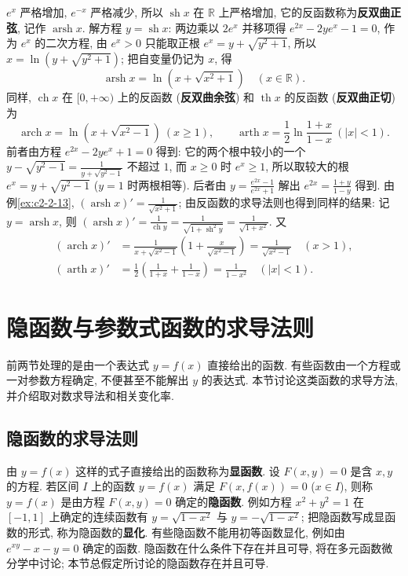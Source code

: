 \documentclass[UTF8,openany]{ctexbook}
\theoremstyle{chinesetextbook}
\begin{document}
$e^x$ 严格增加, $e^{-x}$ 严格减少, 所以 $\operatorname{sh}x$ 在 $\mathbb R$ 上严格增加, 它的反函数称为\textbf{反双曲正弦}, 记作 $\operatorname{arsh}x$. 解方程 $y=\operatorname{sh}x$: 两边乘以 $2e^x$ 并移项得 $e^{2x}-2ye^x-1=0$, 作为 $e^x$ 的二次方程, 由 $e^x>0$ 只能取正根 $e^x=y+\sqrt{y^2+1}$, 所以 $x=\ln\left(y+\sqrt{y^2+1}\right)$; 把自变量仍记为 $x$, 得
\[
\operatorname{arsh}x=\ln\left(x+\sqrt{x^2+1}\right)\quad(x\in\mathbb R).
\]
同样, $\operatorname{ch}x$ 在 $[0,+\infty)$ 上的反函数 (\textbf{反双曲余弦}) 和 $\operatorname{th}x$ 的反函数 (\textbf{反双曲正切}) 为
\[
\operatorname{arch}x=\ln\left(x+\sqrt{x^2-1}\right)\ (x\ge1),\qquad\operatorname{arth}x=\frac12\ln\frac{1+x}{1-x}\ (|x|<1).
\]
前者由方程 $e^{2x}-2ye^x+1=0$ 得到: 它的两个根中较小的一个 $\displaystyle y-\sqrt{y^2-1}=\frac1{y+\sqrt{y^2-1}}$ 不超过 $1$, 而 $x\ge0$ 时 $e^x\ge1$, 所以取较大的根 $e^x=y+\sqrt{y^2-1}$ ($y=1$ 时两根相等). 后者由 $\displaystyle y=\frac{e^{2x}-1}{e^{2x}+1}$ 解出 $\displaystyle e^{2x}=\frac{1+y}{1-y}$ 得到. 由例\ref{ex:c2-2-13}, $\displaystyle(\operatorname{arsh}x)'=\frac1{\sqrt{x^2+1}}$; 由反函数的求导法则也得到同样的结果: 记 $y=\operatorname{arsh}x$, 则 $\displaystyle(\operatorname{arsh}x)'=\frac1{\operatorname{ch}y}=\frac1{\sqrt{1+\operatorname{sh}^2y}}=\frac1{\sqrt{1+x^2}}$. 又
\[
\begin{aligned}
(\operatorname{arch}x)'&=\frac1{x+\sqrt{x^2-1}}\left(1+\frac x{\sqrt{x^2-1}}\right)=\frac1{\sqrt{x^2-1}}\quad(x>1),\\
(\operatorname{arth}x)'&=\frac12\left(\frac1{1+x}+\frac1{1-x}\right)=\frac1{1-x^2}\quad(|x|<1).
\end{aligned}
\]
\section{隐函数与参数式函数的求导法则}
前两节处理的是由一个表达式 $y=f(x)$ 直接给出的函数. 有些函数由一个方程或一对参数方程确定, 不便甚至不能解出 $y$ 的表达式. 本节讨论这类函数的求导方法, 并介绍取对数求导法和相关变化率.
\subsection{隐函数的求导法则}
由 $y=f(x)$ 这样的式子直接给出的函数称为\textbf{显函数}. 设 $F(x,y)=0$ 是含 $x,y$ 的方程. 若区间 $I$ 上的函数 $y=f(x)$ 满足 $F(x,f(x))=0$ ($x\in I$), 则称 $y=f(x)$ 是由方程 $F(x,y)=0$ 确定的\textbf{隐函数}. 例如方程 $x^2+y^2=1$ 在 $[-1,1]$ 上确定的连续函数有 $y=\sqrt{1-x^2}$ 与 $y=-\sqrt{1-x^2}$; 把隐函数写成显函数的形式, 称为隐函数的\textbf{显化}. 有些隐函数不能用初等函数显化, 例如由 $e^{xy}-x-y=0$ 确定的函数. 隐函数在什么条件下存在并且可导, 将在多元函数微分学中讨论; 本节总假定所讨论的隐函数存在并且可导.
\end{document}

